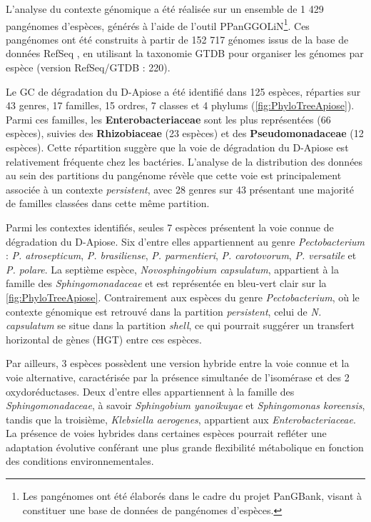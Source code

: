 L’analyse du contexte génomique a été réalisée sur un ensemble de 1 429 pangénomes d’espèces, générés à l’aide de l’outil PPanGGOLiN\footnote{Les pangénomes ont été élaborés dans le cadre du projet PanGBank, visant à constituer une base de données de pangénomes d’espèces.}. Ces pangénomes ont été construits à partir de 152 717 génomes issus de la base de données RefSeq \cite{pruitt_ncbi_2007}, en utilisant la taxonomie GTDB \cite{parks_standardized_2018} pour organiser les génomes par espèce (version RefSeq/GTDB : 220).

\newpage

Le GC de dégradation du D-Apiose a été identifié dans 125 espèces, réparties sur 43 genres, 17 familles, 15 ordres, 7 classes et 4 phylums (\autoref{fig:PhyloTreeApiose}). Parmi ces familles, les \textbf{Enterobacteriaceae} sont les plus représentées (66 espèces), suivies des \textbf{Rhizobiaceae} (23 espèces) et des \textbf{Pseudomonadaceae} (12 espèces). Cette répartition suggère que la voie de dégradation du D-Apiose est relativement fréquente chez les bactéries.
L’analyse de la distribution des données au sein des partitions du pangénome révèle que cette voie est principalement associée à un contexte \textit{persistent}, avec 28 genres sur 43 présentant une majorité de familles classées dans cette même partition.

Parmi les contextes identifiés, seules 7 espèces présentent la voie connue de dégradation du D-Apiose. Six d’entre elles appartiennent au genre \textit{Pectobacterium} : \textit{P. atrosepticum}, \textit{P. brasiliense}, \textit{P. parmentieri}, \textit{P. carotovorum}, \textit{P. versatile} et \textit{P. polare}. La septième espèce, \textit{Novosphingobium capsulatum}, appartient à la famille des \textit{Sphingomonadaceae} et est représentée en bleu-vert clair sur la \autoref{fig:PhyloTreeApiose}. Contrairement aux espèces du genre \textit{Pectobacterium}, où le contexte génomique est retrouvé dans la partition \textit{persistent}, celui de \textit{N. capsulatum} se situe dans la partition \textit{shell}, ce qui pourrait suggérer un transfert horizontal de gènes (HGT) entre ces espèces.

Par ailleurs, 3 espèces possèdent une version hybride entre la voie connue et la voie alternative, caractérisée par la présence simultanée de l’isomérase et des 2 oxydoréductases. Deux d’entre elles appartiennent à la famille des \textit{Sphingomonadaceae}, à savoir \textit{Sphingobium yanoikuyae} et \textit{Sphingomonas koreensis}, tandis que la troisième, \textit{Klebsiella aerogenes}, appartient aux \textit{Enterobacteriaceae}. La présence de voies hybrides dans certaines espèces pourrait refléter une adaptation évolutive conférant une plus grande flexibilité métabolique en fonction des conditions environnementales.

